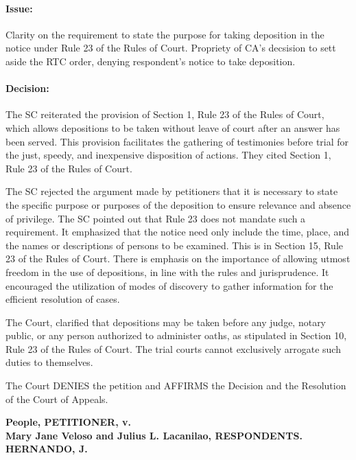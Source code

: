 \documentclass[
12pt,
oneside,
onehalfspacing,
headsepline
]{DigestCollection}
\begin{document}
\paragraph{Issue:}
\label{d4fe0d90-09fd-11ef-932c-63c852f65e48}


Clarity on the requirement to state the purpose for taking deposition in the notice under Rule 23 of the Rules of Court. Propriety of CA's decsision to sett aside the RTC order, denying respondent's notice to take deposition.

\paragraph{Decision:}
\label{d6bcd490-09fd-11ef-932c-63c852f65e48}


The SC reiterated the provision of Section 1, Rule 23 of the Rules of Court, which allows depositions to be taken without leave of court after an answer has been served. This provision facilitates the gathering of testimonies before trial for the just, speedy, and inexpensive disposition of actions. They cited Section 1, Rule 23 of the Rules of Court.

The SC rejected the argument made by petitioners that it is necessary to state the specific purpose or purposes of the deposition to ensure relevance and absence of privilege. The SC pointed out that Rule 23 does not mandate such a requirement. It emphasized that the notice need only include the time, place, and the names or descriptions of persons to be examined. This is in Section 15, Rule 23 of the Rules of Court. There is emphasis on the importance of allowing utmost freedom in the use of depositions, in line with the rules and jurisprudence. It encouraged the utilization of modes of discovery to gather information for the efficient resolution of cases.

The Court, clarified that depositions may be taken before any judge, notary public, or any person authorized to administer oaths, as stipulated in Section 10, Rule 23 of the Rules of Court. The trial courts cannot exclusively arrogate such duties to themselves.

The Court DENIES the petition and AFFIRMS the Decision and the Resolution of the Court of Appeals.

\label{07bc7340-0a10-11ef-932c-63c852f65e48}


\noindent\textbf{People, PETITIONER, v. \\Mary Jane Veloso and Julius L. Lacanilao, RESPONDENTS. HERNANDO, J.}\vspace{0.4cm}
\end{document}
